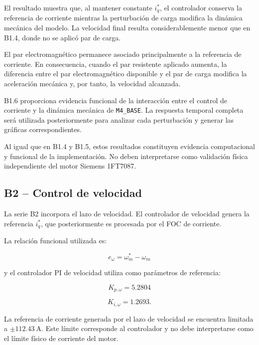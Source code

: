 El resultado muestra que, al mantener constante \(i_q^*\), el controlador conserva la referencia de corriente mientras la perturbación de carga modifica la dinámica mecánica del modelo. La velocidad final resulta considerablemente menor que en B1.4, donde no se aplicó par de carga.

El par electromagnético permanece asociado principalmente a la referencia de corriente. En consecuencia, cuando el par resistente aplicado aumenta, la diferencia entre el par electromagnético disponible y el par de carga modifica la aceleración mecánica y, por tanto, la velocidad alcanzada.

B1.6 proporciona evidencia funcional de la interacción entre el control de corriente y la dinámica mecánica de \texttt{M4\_BASE}. La respuesta temporal completa será utilizada posteriormente para analizar cada perturbación y generar las gráficas correspondientes.

Al igual que en B1.4 y B1.5, estos resultados constituyen evidencia computacional y funcional de la implementación. No deben interpretarse como validación física independiente del motor Siemens 1FT7087.

\subsection{B2 -- Control de velocidad}

La serie B2 incorpora el lazo de velocidad. El controlador de velocidad genera la referencia \(i_q^*\), que posteriormente es procesada por el FOC de corriente.

La relación funcional utilizada es:

\begin{equation}
e_{\omega}
=
\omega_m^*-\omega_m
\end{equation}

y el controlador PI de velocidad utiliza como parámetros de referencia:

\begin{equation}
K_{p,\omega}=5.2804
\end{equation}

\begin{equation}
K_{i,\omega}=1.2693.
\end{equation}

La referencia de corriente generada por el lazo de velocidad se encuentra limitada a \(\pm112.43~\mathrm{A}\). Este límite corresponde al controlador y no debe interpretarse como el límite físico de corriente del motor.

